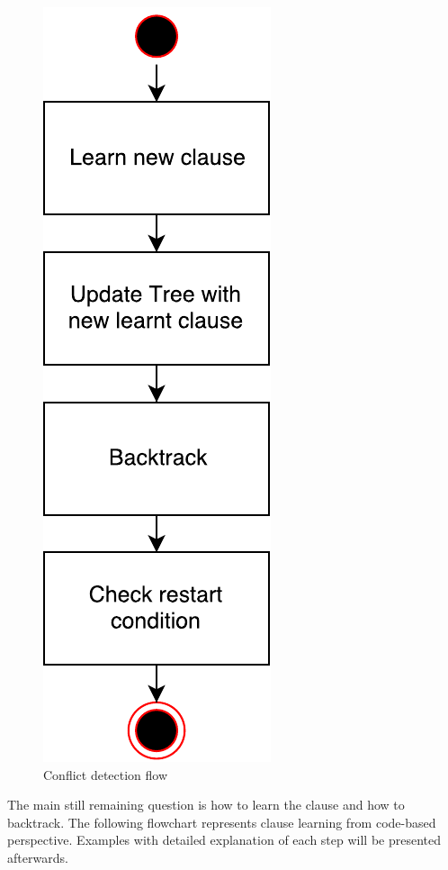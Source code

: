 \documentclass[12pt,english,pdflatex]{aghdpl}
\begin{document}
\begin{figure}[H]
\begin{centering}
\includegraphics[scale=0.7]{img/conflict_detected}
\par\end{centering}
\caption{Conflict detection flow}
\end{figure}

The main still  remaining question is how to learn the clause and how to backtrack.
The following flowchart represents clause learning from code-based perspective.
Examples with detailed explanation of each step will be presented
afterwards.
\end{document}
